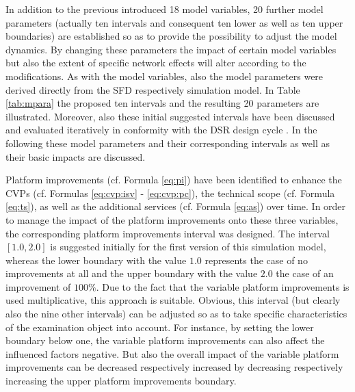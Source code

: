In addition to the previous introduced 18 model variables, 20 further model parameters (actually ten intervals and consequent ten lower as well as ten upper boundaries) are established so as to provide the possibility to adjust the model dynamics. By changing these parameters the impact of certain model variables but also the extent of specific network effects will alter according to the modifications. As with the model variables, also the model parameters were derived directly from the \ac{SFD} respectively simulation model. In Table \ref{tab:mpara} the proposed ten intervals and the resulting 20 parameters are illustrated. Moreover, also these initial suggested intervals have been discussed and evaluated iteratively in conformity with the \ac{DSR} design cycle \citep{Hevner2007}. In the following these model parameters and their corresponding intervals as well as their basic impacts are discussed.

Platform improvements (cf. Formula \ref{eq:pi}) have been identified to enhance the \acp{CVP} (cf. Formulas \ref{eq:cvp:isv} - \ref{eq:cvp:pc}), the technical scope (cf. Formula \ref{eq:ts}), as well as the additional services (cf. Formula \ref{eq:as}) over time. In order to manage the impact of the platform improvements onto these three variables, the corresponding platform improvements interval was designed. The interval $[1.0,2.0]$ is suggested initially for the first version of this simulation model, whereas the lower boundary with the value $1.0$ represents the case of no improvements at all and the upper boundary with the value $2.0$ the case of an improvement of $100\%$. Due to the fact that the variable platform improvements is used multiplicative, this approach is suitable. Obvious, this interval (but clearly also the nine other intervals) can be adjusted so as to take specific characteristics of the examination object into account. For instance, by setting the lower boundary below one, the variable platform improvements can also affect the influenced factors negative. But also the overall impact of the variable platform improvements can be decreased respectively increased by decreasing respectively increasing the upper platform improvements boundary.


